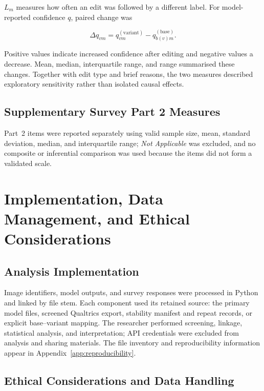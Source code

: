 \(L_m\) measures how often an edit was followed by a different label. For
model-reported confidence \(q\), paired change was

\begin{equation}
    \Delta q_{vm}
    =
    q_{vm}^{(\mathrm{variant})}
    -
    q_{b(v)m}^{(\mathrm{base})}.
\end{equation}

Positive values indicate increased confidence after editing and negative
values a decrease. Mean, median, interquartile range, and range summarised these
changes. Together with edit type and brief reasons, the two measures described
exploratory sensitivity rather than isolated causal effects.


\subsection{Supplementary Survey Part 2 Measures}
\label{subsec:survey_part2_analysis}

Part~2 items were reported separately using valid sample size, mean, standard
deviation, median, and interquartile range; \textit{Not Applicable} was
excluded, and no composite or inferential comparison was used because the
items did not form a validated scale.

\section{Implementation, Data Management, and Ethical Considerations}
\label{sec:implementation}

\subsection{Analysis Implementation}

Image identifiers, model outputs, and survey responses were processed in Python
and linked by file stem. Each component used its retained source: the primary
model files, screened Qualtrics export, stability manifest and repeat records,
or explicit base--variant mapping. The researcher performed screening, linkage,
statistical analysis, and interpretation; API credentials were excluded from
analysis and sharing materials. The file inventory and reproducibility
information appear in Appendix~\ref{app:reproducibility}.


\subsection{Ethical Considerations and Data Handling}
\label{sec:ethical_considerations}

